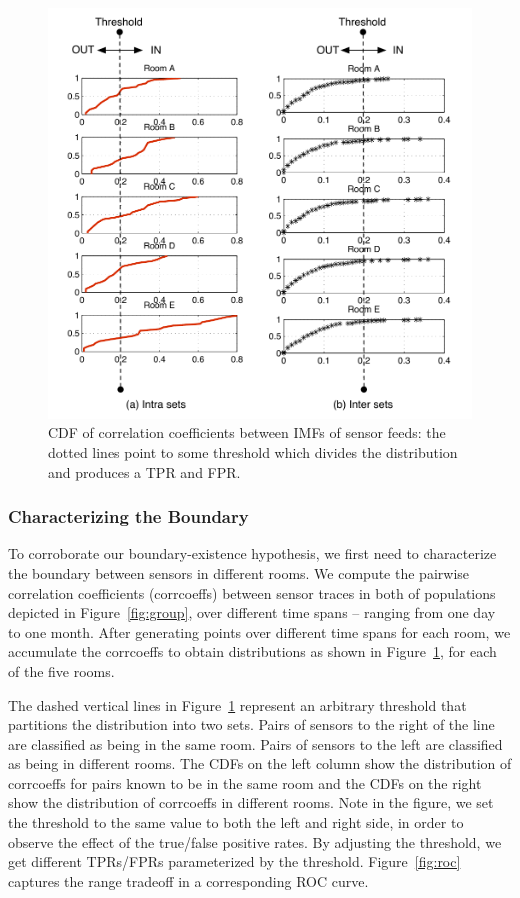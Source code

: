 \begin{figure}[h!]
\centering
	\includegraphics[width=1.0\textwidth]{figs/corrcoeff_cdf_in_out}
\caption{CDF of correlation coefficients between IMFs of sensor feeds: the dotted lines point to some threshold which divides
 the distribution and produces a TPR and FPR.
}
\label{fig:cdf}
\end{figure}

\subsubsection{Characterizing the Boundary}
To corroborate our boundary-existence hypothesis, we first need to characterize the boundary between sensors in different rooms. 
We compute the pairwise correlation coefficients (corrcoeffs) between sensor traces in both of populations depicted in Figure~\ref{fig:group}, 
over different time spans -- ranging from one day to one month.
After generating points over different time 
spans for each room, we accumulate the corrcoeffs to obtain distributions as shown in Figure~\ref{fig:cdf}, for each of the five rooms. 

The dashed vertical lines in Figure~\ref{fig:cdf} 
represent an arbitrary threshold that partitions the distribution into two sets.  Pairs of sensors to the right of the line
are classified as being in the same room.  Pairs of sensors to the left are classified as being in different rooms.
The CDFs on the left column show the distribution of corrcoeffs for pairs known to be in the same room and the CDFs on the right
show the distribution of corrcoeffs in different rooms.
Note in the figure, we set the threshold to the same value to both the left and right side, in order to observe the effect of the true/false positive
rates.
By adjusting the threshold, we get different TPRs/FPRs parameterized by the threshold. Figure~\ref{fig:roc} captures the range tradeoff in a corresponding ROC curve.



